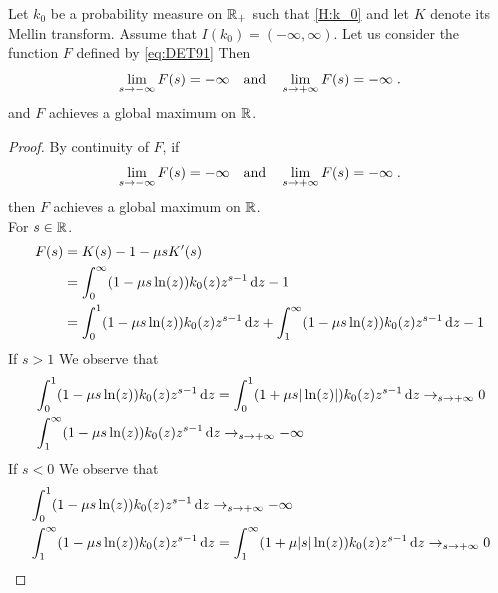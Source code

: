    \begin{lemma}
    \label{lm:coerciveF}
    Let $k_0$ be a probability measure on $\mathbb{R}_+$ such that \eqref{H:k_0} and let $K$ denote its Mellin transform. Assume that $I(k_0) = (-\infty, \infty)$. Let us consider the function $F$ defined by \eqref{eq:DET91}
        Then 
        \begin{equation*}
            \lim_{s \to -\infty} F(s) = -\infty 
            \quad \text{and} \quad
            \lim_{s \to +\infty} F(s) = -\infty 
            \; .
        \end{equation*}
    and $F$ achieves a global maximum on $\mathbb{R}$. 
    \end{lemma}
    \begin{proof}
        By continuity of $F$, if  \begin{equation*}
            \lim_{s \to -\infty} F(s) = -\infty 
            \quad \text{and} \quad
            \lim_{s \to +\infty} F(s) = -\infty 
            \; .
        \end{equation*}
        then $F$ achieves a global maximum on $\mathbb{R}$.\\
        For $s \in \mathbb{R}$.  
        \begin{align*}
            F(s) 
            &= K(s) - 1 - \mu s K'(s) \\
            &= \int_0^\infty (1 - \mu s \ln(z))k_0(z)z^{s-1} \,\mathrm{d} z - 1 \\
            &= \int_0^1 (1 - \mu s \ln(z))k_0(z)z^{s-1} \,\mathrm{d} z +  \int_1^\infty (1 - \mu s \ln(z))k_0(z)z^{s-1} \,\mathrm{d} z
             - 1 
        \end{align*}
    If $s > 1$
    We observe that
    \begin{align*}
        &\int_0^1 (1 - \mu s \ln(z))k_0(z)z^{s-1} \,\mathrm{d} z
        = \int_0^1 (1 + \mu s |\ln(z)|)k_0(z)z^{s-1} \,\mathrm{d} z
        \to_{s \to +\infty} 0 \\
        &\int_1^\infty (1 - \mu s \ln(z))k_0(z)z^{s-1} \,\mathrm{d} z
        \to_{s \to +\infty} -\infty
    \end{align*}
    If $s < 0$
    We observe that
    \begin{align*}
        &\int_0^1 (1 - \mu s \ln(z))k_0(z)z^{s-1} \,\mathrm{d} z
        \to_{s \to +\infty} -\infty \\
        &\int_1^\infty (1 - \mu s \ln(z))k_0(z)z^{s-1} \,\mathrm{d} z = \int_1^\infty (1 + \mu |s| \ln(z))k_0(z)z^{s-1} \,\mathrm{d} z
        \to_{s \to +\infty} 0
    \end{align*}
    \end{proof}

